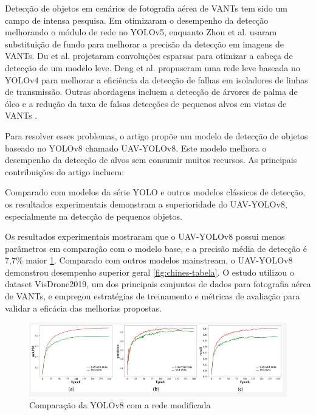 Detecção de objetos em cenários de fotografia aérea de VANTs tem sido um campo de intensa pesquisa. Em \cite{luo2022target} otimizaram o desempenho da detecção melhorando o módulo de rede no YOLOv5, enquanto Zhou et al. usaram substituição de fundo para melhorar a precisão da detecção em imagens de VANTs. Du et al. projetaram convoluções esparsas para otimizar a cabeça de detecção de um modelo leve. Deng et al. propuseram uma rede leve baseada no YOLOv4 para melhorar a eficiência da detecção de falhas em isoladores de linhas de transmissão. Outras abordagens incluem a detecção de árvores de palma de óleo e a redução da taxa de falsas detecções de pequenos alvos em vistas de VANTs .

Para resolver esses problemas, o artigo propõe um modelo de detecção de objetos baseado no YOLOv8 chamado UAV-YOLOv8. Este modelo melhora o desempenho da detecção de alvos sem consumir muitos recursos. As principais contribuições do artigo incluem:

Comparado com modelos da série YOLO e outros modelos clássicos de detecção, os resultados experimentais demonstram a superioridade do UAV-YOLOv8, especialmente na detecção de pequenos objetos.

Os resultados experimentais mostraram que o UAV-YOLOv8 possui menos parâmetros em comparação com o modelo base, e a precisão média de detecção é 7,7\% maior \ref{fig:chines}. Comparado com outros modelos mainstream, o UAV-YOLOv8 demonstrou desempenho superior geral \ref{fig:chines-tabela}. O estudo utilizou o dataset VisDrone2019, um dos principais conjuntos de dados para fotografia aérea de VANTs, e empregou estratégias de treinamento e métricas de avaliação para validar a eficácia das melhorias propostas.

\begin{figure}[!h]
    \center
    \begin{minipage}{0.9\linewidth}
        \center
        \captionsetup{justification=centering,margin=0.5cm,font=small}
        \includegraphics[width=0.7\linewidth]{img/cap3/chines.jpeg}
        \caption{Comparação da YOLOv8 com a rede modificada}
        \label{fig:chines}
    \end{minipage}
\end{figure}

